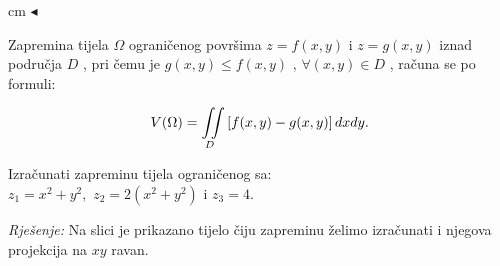 \documentclass[a4paper,11pt]{article}
\begin{document}
  cm $\blacktriangleleft$ \\
 \begin{tcolorbox}[enhanced,attach boxed title to top center={yshift=-3mm,yshifttext=-1mm},
  colback=yellow!15!white,colframe=red!755!yellow,colbacktitle=brown!90!white,
  title=Zapremina,fonttitle=\bfseries,
  boxed title style={size=small,colframe=red!50!black} ]
    Zapremina tijela $ \Omega$ ograničenog površima $ z=f(x,y)$ i $ z=g(x,y)$ iznad područja $ D$ , pri čemu je $ g(x,y)\leq f(x,y)$ , $ \forall (x,y)\in D$ ,  računa se po formuli:

$$\displaystyle \displaystyle V(\Omega) = \iint\limits_D \left[f(x,y)-g(x,y)\right] dx dy.$$ 	   

\end{tcolorbox}
 \begin{tcolorbox}[colback=brown!35!white,colframe=white!75!white,title= $$\bullet \bullet \bullet$$]
         \begin{zadatak}
Izračunati zapreminu tijela ograničenog sa: \\ $z_1 = x^{2} + y^{2},$ $z_2 = 2(x^{2} + y^{2})$ i $z_3 =4.$
\end{zadatak}
\end{tcolorbox}
\emph{Rješenje: }
Na slici je prikazano tijelo čiju zapreminu želimo izračunati i njegova projekcija na $ xy$ ravan. 
\begin{center}
\end{center}
\end{document}
